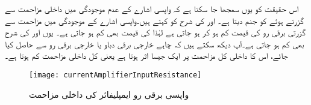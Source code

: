 اس حقیقت کو یوں سمجھا جا سکتا ہے کہ واپسی اشارے کے عدم موجودگی میں   داخلی مزاحمت  سے گزرتے ہوئے    کو جنم دیتا ہے۔ اور  کی شرح کو  کہتے ہیں۔واپسی اشارے کے موجودگی میں مزاحمت  سے گزرتی برقی رو کی قیمت کم ہو کر  ہو جاتی ہے لہٰذا   کی قیمت بھی کم ہو جاتی ہے۔ یوں  اور  کی شرح بھی کم ہو جاتی ہے۔آپ دیکھ سکتے ہیں کہ  چاہے خارجی برقی دباو  یا خارجی برقی رو  سے حاصل کیا جائے، اس کا داخلی کل مزاحمت پر ایک جیسا اثر ہوتا ہے یعنی کل داخلی مزاحمت کم ہوتا ہے۔ 
\begin{figure}
\centering
\texttt{[image: currentAmplifierInputResistance]}
\caption{واپسی برقی رو ایمپلیفائر کی داخلی مزاحمت}
\label{شکل_واپسی_رو_ایمپلیفائر_داخلی_مزاحمت}
\end{figure}


